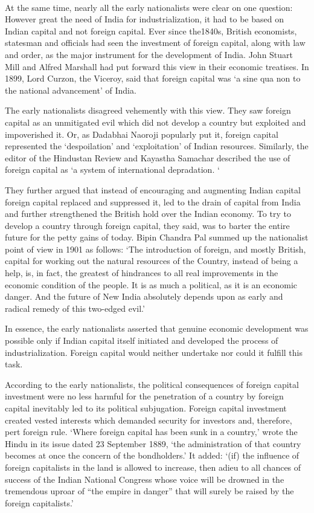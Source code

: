 \paragraph*{}


At the same time, nearly all the early nationalists were clear on one question: However great the need of India for industrialization, it had to be based on Indian capital and not foreign capital. Ever since the1840s, British economists, statesman and officials had seen the investment of foreign capital, along with law and order, as the major instrument for the development of India. John Stuart Mill and Alfred Marshall had put forward this view in their economic treatises. In 1899, Lord Curzon, the Viceroy, said that foreign capital was `a sine qua non to the national advancement' of India.

The early nationalists disagreed vehemently with this view. They saw foreign capital as an unmitigated evil which did not develop a country but exploited and impoverished it. Or, as Dadabhai Naoroji popularly put it, foreign capital represented the `despoilation' and `exploitation' of Indian resources. Similarly, the editor of the Hindustan Review and Kayastha Samachar described the use of foreign capital as `a system of international depradation. `

They further argued that instead of encouraging and augmenting Indian capital foreign capital replaced and suppressed it, led to the drain of capital from India and further strengthened the British hold over the Indian economy. To try to develop a country through foreign capital, they said, was to barter the entire future for the petty gains of today. Bipin Chandra Pal summed up the nationalist point of view in 1901 as follows: `The introduction of foreign, and mostly British, capital for working out the natural resources of the Country, instead of being a help, is, in fact, the greatest of hindrances to all real improvements in the economic condition of the people. It is as much a political, as it is an economic danger. And the future of New India absolutely depends upon as early and radical remedy of this two-edged evil.'

In essence, the early nationalists asserted that genuine economic development was possible only if Indian capital itself initiated and developed the process of industrialization. Foreign capital would neither undertake nor could it fulfill this task.

According to the early nationalists, the political consequences of foreign capital investment were no less harmful for the penetration of a country by foreign capital inevitably led to its political subjugation. Foreign capital investment created vested interests which demanded security for investors and, therefore, pert foreign rule. `Where foreign capital has been sunk in a country,' wrote the Hindu in its issue dated 23 September 1889, `the administration of that country becomes at once the concern of the bondholders.' It added: `(if) the influence of foreign capitalists in the land is allowed to increase, then adieu to all chances of success of the Indian National Congress whose voice will be drowned in the tremendous uproar of ``the empire in danger'' that will surely be raised by the foreign capitalists.'


